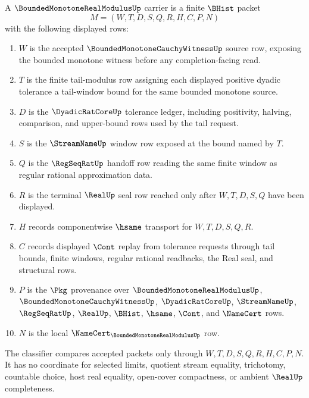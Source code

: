 \begin{definition}
\label{def:bounded-monotone-real-modulus-carrier}
A $\BoundedMonotoneRealModulusUp$ carrier is a finite $\BHist$ packet
$$
M=(W,T,D,S,Q,R,H,C,P,N)
$$
with the following displayed rows:
\begin{enumerate}
\item $W$ is the accepted $\BoundedMonotoneCauchyWitnessUp$ source row, exposing the bounded monotone witness before any completion-facing read.
\item $T$ is the finite tail-modulus row assigning each displayed positive dyadic tolerance a tail-window bound for the same bounded monotone source.
\item $D$ is the $\DyadicRatCoreUp$ tolerance ledger, including positivity, halving, comparison, and upper-bound rows used by the tail request.
\item $S$ is the $\StreamNameUp$ window row exposed at the bound named by $T$.
\item $Q$ is the $\RegSeqRatUp$ handoff row reading the same finite window as regular rational approximation data.
\item $R$ is the terminal $\RealUp$ seal row reached only after $W,T,D,S,Q$ have been displayed.
\item $H$ records componentwise $\hsame$ transport for $W,T,D,S,Q,R$.
\item $C$ records displayed $\Cont$ replay from tolerance requests through tail bounds, finite windows, regular rational readbacks, the Real seal, and structural rows.
\item $P$ is the $\Pkg$ provenance over $\BoundedMonotoneRealModulusUp$, $\BoundedMonotoneCauchyWitnessUp$, $\DyadicRatCoreUp$, $\StreamNameUp$, $\RegSeqRatUp$, $\RealUp$, $\BHist$, $\hsame$, $\Cont$, and $\NameCert$ rows.
\item $N$ is the local $\NameCert_{\BoundedMonotoneRealModulusUp}$ row.
\end{enumerate}
The classifier compares accepted packets only through $W,T,D,S,Q,R,H,C,P,N$. It has no coordinate for selected limits, quotient stream equality, trichotomy, countable choice, host real equality, open-cover compactness, or ambient $\RealUp$ completeness.
\end{definition}

